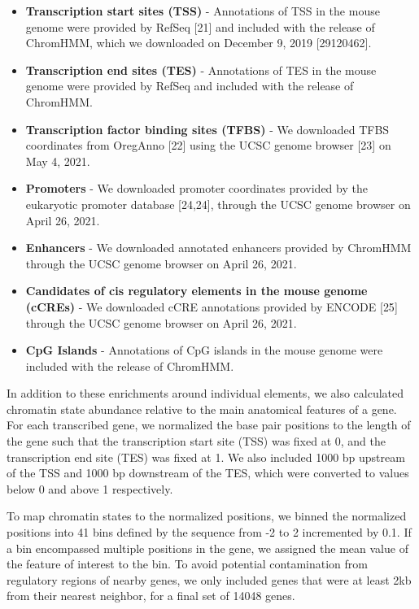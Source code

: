 \documentclass[10pt,letterpaper]{article}
\providecommand{\tightlist}{%
  \setlength{\itemsep}{0pt}\setlength{\parskip}{0pt}}
\begin{document}
\begin{itemize}
\tightlist
\item
  \textbf{Transcription start sites (TSS)} - Annotations of TSS in the
  mouse genome were provided by RefSeq {[}21{]} and included with the
  release of ChromHMM, which we downloaded on December 9, 2019
  {[}29120462{]}.
\item
  \textbf{Transcription end sites (TES)} - Annotations of TES in the
  mouse genome were provided by RefSeq and included with the release of
  ChromHMM.
\item
  \textbf{Transcription factor binding sites (TFBS)} - We downloaded
  TFBS coordinates from OregAnno {[}22{]} using the UCSC genome browser
  {[}23{]} on May 4, 2021.
\item
  \textbf{Promoters} - We downloaded promoter coordinates provided by
  the eukaryotic promoter database {[}24,24{]}, through the UCSC genome
  browser on April 26, 2021.
\item
  \textbf{Enhancers} - We downloaded annotated enhancers provided by
  ChromHMM through the UCSC genome browser on April 26, 2021.
\item
  \textbf{Candidates of cis regulatory elements in the mouse genome
  (cCREs)} - We downloaded cCRE annotations provided by ENCODE {[}25{]}
  through the UCSC genome browser on April 26, 2021.
\item
  \textbf{CpG Islands} - Annotations of CpG islands in the mouse genome
  were included with the release of ChromHMM.
\end{itemize}

In addition to these enrichments around individual elements, we also
calculated chromatin state abundance relative to the main anatomical
features of a gene. For each transcribed gene, we normalized the base
pair positions to the length of the gene such that the transcription
start site (TSS) was fixed at 0, and the transcription end site (TES)
was fixed at 1. We also included 1000 bp upstream of the TSS and 1000 bp
downstream of the TES, which were converted to values below 0 and above
1 respectively.

To map chromatin states to the normalized positions, we binned the
normalized positions into 41 bins defined by the sequence from -2 to 2
incremented by 0.1. If a bin encompassed multiple positions in the gene,
we assigned the mean value of the feature of interest to the bin. To
avoid potential contamination from regulatory regions of nearby genes,
we only included genes that were at least 2kb from their nearest
neighbor, for a final set of 14048 genes.
\end{document}
